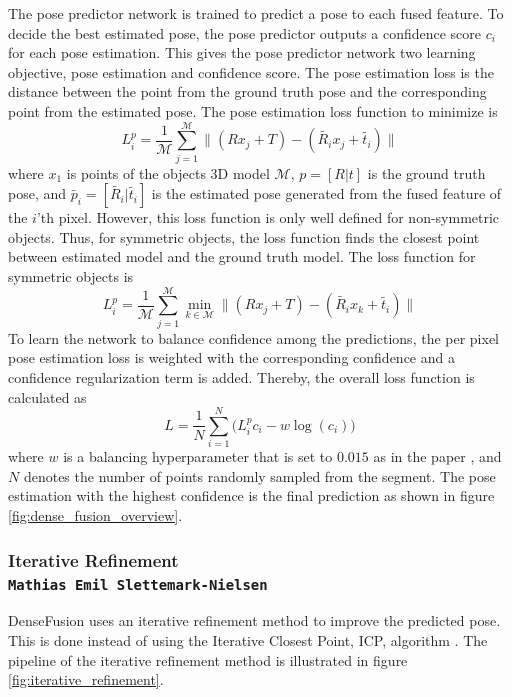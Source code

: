 \documentclass[../main.tex]{subfiles}
\begin{document}
The pose predictor network is trained to predict a pose to each fused feature. To decide the best estimated pose, the pose predictor outputs a confidence score $c_i$ for each pose estimation. This gives the pose predictor network two learning objective, pose estimation and confidence score. The pose estimation loss is the distance between the point from the ground truth pose and the corresponding point from the estimated pose. The pose estimation loss function to minimize is
\begin{equation}
    \label{eqn:loss_pose_estimation}
    L_i^p = \frac{1}{\mathcal{M}} \sum_{j=1}^{\mathcal{M}} \big\| (R x_j + T) - (\tilde{R_i} x_j + \tilde{t_i}) \big\|
\end{equation}
where $x_1$ is points of the objects 3D model $\mathcal{M}$, $p=[R | t]$ is the ground truth pose, and $\tilde{p_i}=[\tilde{R_i} | \tilde{t_i}]$ is the estimated pose generated from the fused feature of the $i$'th pixel. However, this loss function is only well defined for non-symmetric objects. Thus, for symmetric objects, the loss function finds the closest point between estimated model and the ground truth model. The loss function for symmetric objects is
\begin{equation}
    \label{eqn:loss_pose_estimation}
    L_i^p = \frac{1}{\mathcal{M}} \sum_{j=1}^{\mathcal{M}} \min_{k \in \mathcal{M}} \big\| (R x_j + T) - (\tilde{R_i} x_k + \tilde{t_i}) \big\|
\end{equation}
To learn the network to balance confidence among the predictions, the per pixel pose estimation loss is weighted with the corresponding confidence and a confidence regularization term is added. Thereby, the overall loss function is calculated as
\begin{equation}
    \label{eqn:loss_overall}
    L = \frac{1}{N} \sum_{i=1}^N \big( L_i^p c_i - w \log (c_i) \big)
\end{equation}
where $w$ is a balancing hyperparameter that is set to $0.015$ as in the paper \cite{densefusion}, and $N$ denotes the number of points randomly sampled from the segment. The pose estimation with the highest confidence is the final prediction as shown in figure \ref{fig:dense_fusion_overview}.

\subsubsection{Iterative Refinement\\ \normalfont\normalsize\texttt{Mathias Emil Slettemark-Nielsen}} \label{subsubsec:refinement}
DenseFusion uses an iterative refinement method to improve the predicted pose. This is done instead of using the Iterative Closest Point, ICP, algorithm \cite{icp}. The pipeline of the iterative refinement method is illustrated in figure \ref{fig:iterative_refinement}.
\end{document}
